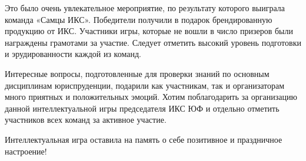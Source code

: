 
Это было очень увлекательное мероприятие, по результату которого выиграла
команда  «Самцы ИКС». Победители получили в подарок брендированную продукцию от
ИКС. Участники игры, которые не вошли в число призеров были награждены
грамотами за участие. Следует отметить высокий уровень подготовки и
эрудированности каждой из команд.

Интересные вопросы, подготовленные для проверки знаний по основным дисциплинам
юриспруденции, подарили как участникам, так и организаторам много приятных и
положительных эмоций. Хотим поблагодарить за организацию данной
интеллектуальной игры председателя ИКС ЮФ и отдельно отметить участников всех
команд за активное участие.

Интеллектуальная игра оставила на память о себе позитивное и праздничное
настроение!


